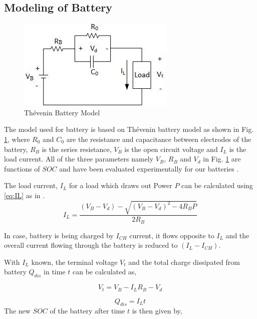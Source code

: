 \documentclass[journal]{IEEEtran/IEEEtran}
\newcommand{\figref}[1]{Fig. \ref{#1}}
\begin{document}
	\subsection{Modeling of Battery}
	\begin{figure}[!b]
		\centering
		\includegraphics[width=0.7\linewidth]{Thevenin.jpg}
		\caption{Th\'{e}venin Battery Model}
		\label{fig:thevenin}
	\end{figure}
	
	The model used for battery is based on Th\'{e}venin battery model \cite{bat_thevenin} as shown in  \figref{fig:thevenin}, where $R_0$ and $C_0$ are the resistance and capacitance between electrodes of the battery, $R_B$ is the series resistance, $V_B$ is the open circuit voltage and $I_L$ is the load current. All of the three parameters namely  $V_B$, $R_B$ and $V_d$ in \figref{fig:thevenin} are functions of $\mathit{SOC}$ and have been evaluated experimentally for our batteries \cite{sadia}.
	
	The load current, $I_L$  for a load which draws out Power $P$ can be calculated using \eqref{eq:IL} as in \cite{bat_thevenin}.
	\begin{equation}
	\label{eq:IL}
	I_L = \frac{\left(V_B-V_d\right)-\sqrt{\left(V_B-V_d\right)^2-4R_BP}}{2R_B} 
	\end{equation}
	
	In case, battery is being charged by $I_{CH}$ current, it flows opposite to $I_L$ and the overall current flowing through the battery is reduced to $(I_L-I_{CH})$.
	
	With $I_L$ known, the terminal voltage $V_t$ and the total charge dissipated from battery $Q_{dis}$ in time $t$ can be calculated as,
	
	\begin{equation}
	\label{eq:Vt}
	V_t = V_B-I_LR_B-V_d
	\end{equation}	
	
	\begin{equation}
	\label{eq:Qdis}
	Q_{dis}=I_Lt
	\end{equation}	
	The new $\mathit{SOC}$ of the battery after time $t$ is then given by,
	
\end{document}
